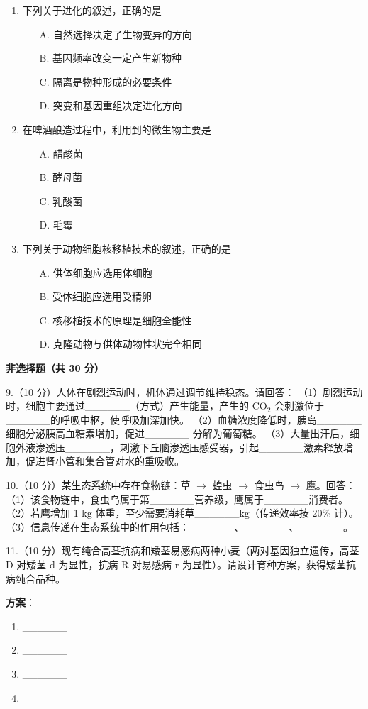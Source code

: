 \begin{enumerate}
  \item 下列关于进化的叙述，正确的是
  \begin{enumerate}
    \item[A.] 自然选择决定了生物变异的方向
    \item[B.] 基因频率改变一定产生新物种
    \item[C.] 隔离是物种形成的必要条件
    \item[D.] 突变和基因重组决定进化方向
  \end{enumerate}

  \item 在啤酒酿造过程中，利用到的微生物主要是
  \begin{enumerate}
    \item[A.] 醋酸菌
    \item[B.] 酵母菌
    \item[C.] 乳酸菌
    \item[D.] 毛霉
  \end{enumerate}

  \item 下列关于动物细胞核移植技术的叙述，正确的是
  \begin{enumerate}
    \item[A.] 供体细胞应选用体细胞
    \item[B.] 受体细胞应选用受精卵
    \item[C.] 核移植技术的原理是细胞全能性
    \item[D.] 克隆动物与供体动物性状完全相同
  \end{enumerate}
\end{enumerate}

\textbf{非选择题（共 30 分）}

9.（10 分）人体在剧烈运动时，机体通过调节维持稳态。请回答：
（1）剧烈运动时，细胞主要通过\_\_\_\_\_\_（方式）产生能量，产生的 CO$_2$ 会刺激位于\_\_\_\_\_\_的呼吸中枢，使呼吸加深加快。
（2）血糖浓度降低时，胰岛\_\_\_\_\_\_细胞分泌胰高血糖素增加，促进\_\_\_\_\_\_ 分解为葡萄糖。
（3）大量出汗后，细胞外液渗透压\_\_\_\_\_\_，刺激下丘脑渗透压感受器，引起\_\_\_\_\_\_激素释放增加，促进肾小管和集合管对水的重吸收。
\vspace{3cm}

10.（10 分）某生态系统中存在食物链：草 $\to$ 蝗虫 $\to$ 食虫鸟 $\to$ 鹰。回答：
（1）该食物链中，食虫鸟属于第\_\_\_\_\_\_营养级，鹰属于\_\_\_\_\_\_消费者。
（2）若鹰增加 1 kg 体重，至少需要消耗草\_\_\_\_\_\_kg（传递效率按 20\% 计）。
（3）信息传递在生态系统中的作用包括：\_\_\_\_\_\_、\_\_\_\_\_\_、\_\_\_\_\_\_。
\vspace{3cm}

11.（10 分）现有纯合高茎抗病和矮茎易感病两种小麦（两对基因独立遗传，高茎 D 对矮茎 d 为显性，抗病 R 对易感病 r 为显性）。请设计育种方案，获得矮茎抗病纯合品种。

\textbf{方案}：
\begin{enumerate}
  \item \_\_\_\_\_\_
  \item \_\_\_\_\_\_
  \item \_\_\_\_\_\_
  \item \_\_\_\_\_\_
\end{enumerate}
